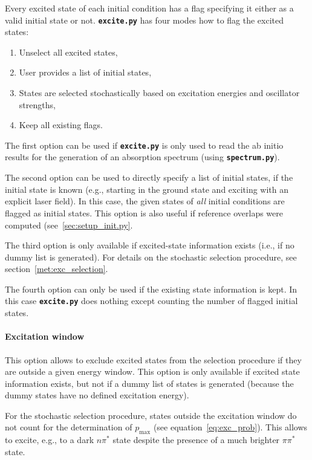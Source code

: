 \documentclass[a4paper,10pt,DIV=15,openany,twoside=false]{scrbook}
\newcommand{\ttt}[1]{\textbf{\texttt{#1}}}
\begin{document}
Every excited state of each initial condition has a flag specifying it either as a valid initial state or not. \ttt{excite.py} has four modes how to flag the excited states:
\begin{enumerate}
  \item Unselect all excited states,
  \item User provides a list of initial states,
  \item States are selected stochastically based on excitation energies and oscillator strengths,
  \item Keep all existing flags.
\end{enumerate}
The first option can be used if \ttt{excite.py} is only used to read the ab initio results for the generation of an absorption spectrum (using \ttt{spectrum.py}). 

The second option can be used to directly specify a list of initial states, if the initial state is known (e.g., starting in the ground state and exciting with an explicit laser field). In this case, the given states of \textit{all} initial conditions are flagged as initial states. This option is also useful if reference overlaps were computed (see~\ref{sec:setup_init.py}.

The third option is only available if excited-state information exists (i.e., if no dummy list is generated). For details on the stochastic selection procedure, see section~\ref{met:exc_selection}. 

The fourth option can only be used if the existing state information is kept. In this case \ttt{excite.py} does nothing except counting the number of flagged initial states.

\paragraph{Excitation window}

This option allows to exclude excited states from the selection procedure if they are outside a given energy window. This option is only available if excited state information exists, but not if a dummy list of states is generated (because the dummy states have no defined excitation energy).

For the stochastic selection procedure, states outside the excitation window do not count for the determination of $p_\text{max}$ (see equation~\eqref{eq:exc_prob}). This allows to excite, e.g., to a dark $n\pi^*$ state despite the presence of a much brighter $\pi\pi^*$ state.
\end{document}
